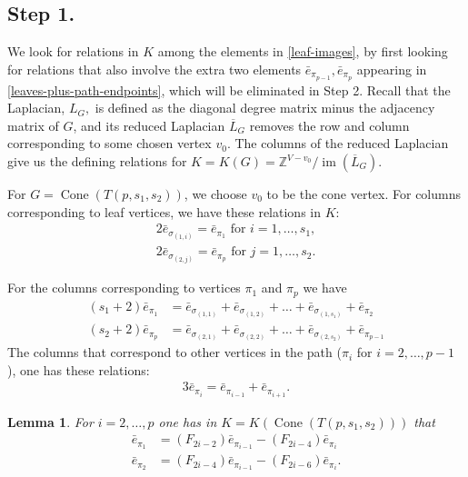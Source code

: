 \documentclass[10pt,reqno]{amsart}
\newcommand{\Z}{\mathbb{Z}}
\DeclareMathOperator{\Cone}{Cone}
\DeclareMathOperator{\im}{im}
\newtheorem{lemma}[theorem]{Lemma}
\begin{document}
\subsection{Step 1.}

We look for relations in $K$ among the elements in \eqref{leaf-images}, by first looking for relations that also involve the
extra two elements 
$
\bar{e}_{\pi_{p-1}},
\bar{e}_{\pi_p}
$
appearing in \eqref{leaves-plus-path-endpoints},
which will be eliminated in {\sf Step 2}.
Recall that the Laplacian, $L_G,$ is defined as the diagonal degree matrix minus the adjacency matrix of $G$, and its reduced
Laplacian $\overline{L}_G$ removes the row and column corresponding to some chosen vertex $v_0$. The columns of the reduced Laplacian
give us the defining relations for $K=K(G)=\Z^{V-v_0}/\im(\overline{L}_G)$.

For $G=\Cone(T(p,s_1,s_2))$, we choose $v_0$ to be the cone vertex. For columns corresponding to leaf vertices, we have
these relations in $K$:
\begin{align}
2\bar{e}_{\sigma_{(1,i)}} = \bar{e}_{\pi_1} \text{ for }i = 1, \dots, s_1,\label{sigma1_pi_1}\\
2\bar{e}_{\sigma_{(2,j)}} = \bar{e}_{\pi_p} \text{ for }j = 1, \dots, s_2\label{sigma2_pi_p}.  
\end{align}

For the columns corresponding to vertices $\pi_1$ and $\pi_p$ we have 
\begin{align}(s_1+2)\bar{e}_{\pi_1} &= \bar{e}_{\sigma_{(1,1)}}+
\bar{e}_{\sigma_{(1,2)}}+
\ldots
+\bar{e}_{\sigma_{(1,s_1)}}+ \bar{e}_{\pi_2}\label{column_1}\\
(s_2+2)\bar{e}_{\pi_p} &= \bar{e}_{\sigma_{(2,1)}}+
\bar{e}_{\sigma_{(2,2)}}+
\ldots
+\bar{e}_{\sigma_{(2,s_2)}}+ \bar{e}_{\pi_{p-1}}\label{column_2}
\end{align}
The columns that correspond to other vertices in the path 
($\pi_i$ for $i = 2,\ldots, p-1$ ), one has these relations:
\begin{align}
 3\bar{e}_{\pi_i}  =  \bar{e}_{\pi_{i-1}} + \bar{e}_{\pi_{i+1}}.\label{path_relation}
\end{align}


\begin{lemma}
\label{CT-trunk-lemma}
For $i=2,\ldots,p$ one has in  $K=K(\Cone(T(p,s_1,s_2)))$ that
\begin{align}   
\bar{e}_{\pi_1}
&= 
(F_{2i-2} )\bar{e}_{\pi_{i-1}}-(F_{2i-4})\bar{e}_{\pi_{i}} \label{e_1}\\
\bar{e}_{\pi_2}
&= 
(F_{2i-4} )\bar{e}_{\pi_{i-1}}-(F_{2i-6}) \bar{e}_{\pi_{i}}\label{e_2} . 
\end{align}

\end{lemma}
\end{document}
